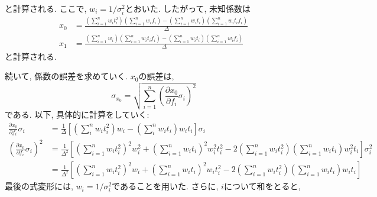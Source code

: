と計算される. ここで, $w_{i} = 1/\sigma_{i}^{2}$とおいた. 
したがって, 未知係数は
\begin{align}
    x_{0} &=
    \frac
    {
        \left(\sum_{i=1}^{n} w_{i} t_{i}^{2}\right)
        \left(\sum_{i=1}^{n} w_{i} f_{i}\right)
        -
        \left(\sum_{i=1}^{n} w_{i} t_{i}\right)
        \left(\sum_{i=1}^{n} w_{i} t_{i} f_{i}\right)
    }{\Delta}
    \\
    x_{1} &=
    \frac
    {
        \left(\sum_{i=1}^{n} w_{i} \right)
        \left(\sum_{i=1}^{n} w_{i} t_{i} f_{i}\right)
        -
        \left(\sum_{i=1}^{n} w_{i} t_{i}\right)
        \left(\sum_{i=1}^{n} w_{i} f_{i}\right)
    }{\Delta}
\end{align}
と計算される. 

続いて, 係数の誤差を求めていく. 
$x_{0}$の誤差は, 
\begin{equation}
    \sigma_{x_{0}}
    =
    \sqrt
    {
        \sum_{i=1}^{n}
        \left(\frac{\partial x_{0}}{\partial f_{i}} \sigma_{i}\right)^{2}
    }
\end{equation}
である. 以下, 具体的に計算をしていく:
\begin{align}
    \frac{\partial x_{0}}{\partial f_{i}} \sigma_{i}
    &=
    \frac{1}{\Delta}
    \left[
        \left(\sum_{i}^{n} w_{i} t_{i}^{2}\right) w_{i}
        -
        \left(\sum_{i}^{n} w_{i} t_{i}\right)w_{i} t_{i}
    \right]
    \sigma_{i}
    \\
    \left(\frac{\partial x_{0}}{\partial f_{i}} \sigma_{i}\right)^{2}
    &=
    \frac{1}{\Delta^{2}}
    \left[
        \left(\sum_{i=1}^{n} w_{i} t_{i}^{2}\right)^{2} w_{i}^{2}
        +
        \left(\sum_{i=1}^{n} w_{i} t_{i}\right)^{2} w_{i}^{2} t_{i}^{2}
        -
        2
        \left(\sum_{i=1}^{n} w_{i} t_{i}^{2}\right)
        \left(\sum_{i=1}^{n} w_{i} t_{i}\right) w_{i}^{2} t_{i}
    \right] \sigma_{i}^{2}
    \\ &=
    \frac{1}{\Delta^{2}}
    \left[
        \left(\sum_{i=1}^{n} w_{i} t_{i}^{2}\right)^{2} w_{i}
        +
        \left(\sum_{i=1}^{n} w_{i} t_{i}\right)^{2} w_{i} t_{i}^{2}
        -
        2
        \left(\sum_{i=1}^{n} w_{i} t_{i}^{2}\right)
        \left(\sum_{i=1}^{n} w_{i} t_{i}\right) w_{i} t_{i}
    \right]
\end{align}
最後の式変形には, $w_{i} = 1/\sigma_{i}^{2}$であることを用いた. 
さらに, $i$について和をとると, 
